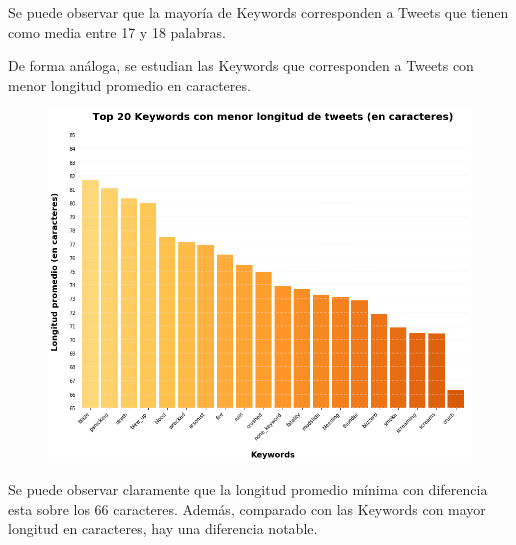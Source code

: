 \documentclass[titlepage,a4paper]{article}
\begin{document}
    Se puede observar que la mayoría de Keywords corresponden a Tweets que tienen como media entre 17 y 18 palabras.
    
    De forma análoga, se estudian las Keywords que corresponden a Tweets con menor longitud promedio en caracteres. 
    
    \begin{figure}[H]
    \centering
    \includegraphics[width=1\textwidth]{graficos/Analisis de Keyword/top_20_keywords_con_menor_long_de_tweets_en_caracteres.png}
    \caption{} 
    \end{figure}
    
    Se puede observar claramente que la longitud promedio mínima con diferencia esta sobre los 66 caracteres. Además, comparado con las Keywords con mayor longitud en caracteres, hay una diferencia notable. 
    
\end{document}
